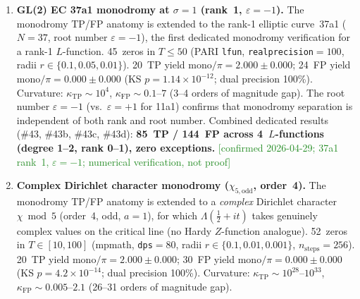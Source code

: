 \documentclass[11pt, a4paper]{article}
\theoremstyle{definition}
\theoremstyle{plain}
\begin{document}
\begin{enumerate}
        $\kappa_{\mathrm{FP}} \sim 0.1$--$6$ (3--4 orders of magnitude gap).
        This is the first dedicated monodromy TP/FP verification at a
        non-$\frac{1}{2}$ critical line, confirming that the perfect
        separation is both degree-independent and critical-line-independent.
        Combined with results~\#43, \#43b, and \#43d:
        \textbf{85~TP / 144~FP across 4~$L$-functions
        (degree 1--2, rank 0--1), zero exceptions.}
        \textcolor{ForestGreen}{[confirmed 2026-04-29; 11a1 $\sigma{=}1$; numerical verification, not proof]}
  \item \textbf{GL(2) EC 37a1 monodromy at $\sigma = 1$ (rank~1, $\varepsilon = -1$).}
        The monodromy TP/FP anatomy is extended to the rank-1 elliptic
        curve~37a1 ($N=37$, root number $\varepsilon = -1$), the first
        dedicated monodromy verification for a rank-1 $L$-function.
        45~zeros in $T \leq 50$ (PARI \texttt{lfun}, \texttt{realprecision}$=100$,
        radii $r\in\{0.1, 0.05, 0.01\}$).
        20~TP yield mono$/\pi = 2.000 \pm 0.000$;
        24~FP yield mono$/\pi = 0.000 \pm 0.000$
        (KS $p = 1.14 \times 10^{-12}$; dual precision 100\%).
        Curvature: $\kappa_{\mathrm{TP}} \sim 10^{4}$,
        $\kappa_{\mathrm{FP}} \sim 0.1$--$7$ (3--4 orders of magnitude gap).
        The root number $\varepsilon = -1$ (vs.\ $\varepsilon = +1$ for 11a1)
        confirms that monodromy separation is independent of both rank
        and root number.
        Combined dedicated results (\#43, \#43b, \#43c, \#43d):
        \textbf{85~TP / 144~FP across 4~$L$-functions
        (degree 1--2, rank 0--1), zero exceptions.}
        \textcolor{ForestGreen}{[confirmed 2026-04-29; 37a1 rank~1, $\varepsilon{=}{-}1$; numerical verification, not proof]}
  \item \textbf{Complex Dirichlet character monodromy ($\chi_{5,\mathrm{odd}}$, order~4).}
        The monodromy TP/FP anatomy is extended to a \emph{complex}
        Dirichlet character $\chi\bmod 5$ (order~4, odd, $a=1$), for
        which $\Lambda(\tfrac{1}{2}+it)$ takes genuinely complex values
        on the critical line (no Hardy $Z$-function analogue).
        52~zeros in $T\in[10,100]$ (mpmath, \texttt{dps}$=80$,
        radii $r\in\{0.1, 0.01, 0.001\}$, $n_{\mathrm{steps}}=256$).
        20~TP yield mono$/\pi = 2.000 \pm 0.000$;
        30~FP yield mono$/\pi = 0.000 \pm 0.000$
        (KS $p = 4.2 \times 10^{-14}$; dual precision 100\%).
        Curvature: $\kappa_{\mathrm{TP}} \sim 10^{28}$--$10^{33}$,
        $\kappa_{\mathrm{FP}} \sim 0.005$--$2.1$ (26--31 orders of magnitude gap).

\end{enumerate}
\end{document}

